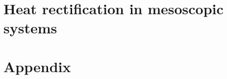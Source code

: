 \documentclass[a4paper, 12pt, twoside, openright]{Thesis} %
\begin{document}
\part{Heat rectification in mesoscopic systems}




\appendix %
\part*{Appendix}



\backmatter
\pagestyle{empty}  %

\label{Bibliography}
\end{document}
